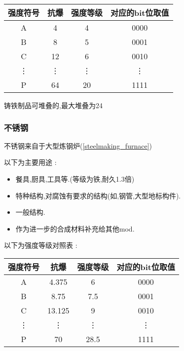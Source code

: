 {{{          \begin{center}
              \begin{tabular}{|c|c|c|c|}
                  \hline
                  强度符号 & 抗爆   & 强度等级 & 对应的bit位取值 \\
                  \hline
                  A        & 4      & 4        & 0000            \\
                  \hline
                  B        & 8      & 5        & 0001            \\
                  \hline
                  C        & 12     & 6        & 0010            \\
                  \vdots   & \vdots & \vdots   & \vdots          \\
                  P        & 64     & 20       & 1111            \\
                  \hline
              \end{tabular}
          \end{center}


          铸铁制品可堆叠的,最大堆叠为24
      }

      \subsubsection{不锈钢}{
          不锈钢来自于大型炼钢炉({\ref{steelmaking_furnace}})

          以下为主要用途 :
          \begin{itemize}[itemsep=1pt]
              \item 餐具,厨具,工具等.(等级为铁,耐久1.3倍)
              \item 特种结构,对腐蚀有要求的结构(如,钢管,大型地标构件).
              \item 一般结构.
              \item 作为进一步的合成材料补充给其他mod.
          \end{itemize}

          以下为强度等级对照表 :

          \begin{center}
              \begin{tabular}{|c|c|c|c|}
                  \hline
                  强度符号 & 抗爆   & 强度等级 & 对应的bit位取值 \\
                  \hline
                  A        & 4.375  & 6        & 0000            \\
                  \hline
                  B        & 8.75   & 7.5      & 0001            \\
                  \hline
                  C        & 13.125 & 9        & 0010            \\
                  \vdots   & \vdots & \vdots   & \vdots          \\
                  P        & 70     & 28.5     & 1111            \\
                  \hline
              \end{tabular}
          \end{center}

}}}
